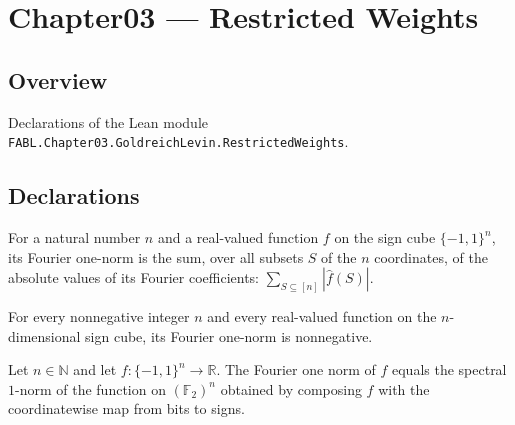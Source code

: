 \chapter{Chapter03 — Restricted Weights}
\section{Overview}

Declarations of the Lean module \texttt{FABL.Chapter03.GoldreichLevin.RestrictedWeights}.

\section{Declarations}

\begin{definition}
\label{FABL.fourierOneNorm}
\leanok
{}
For a natural number $n$ and a real-valued function $f$ on the sign cube $\{−1,1\}^n$,
its Fourier one-norm is the sum, over all subsets $S$ of the $n$ coordinates, of the
absolute values of its Fourier coefficients: $\sum_{S\subseteq[n]} |\widehat f(S)|$.
\end{definition}

\begin{theorem}
\label{FABL.fourierOneNorm_nonneg}
\leanok
{}
For every nonnegative integer $n$ and every real-valued function on the $n$-dimensional
sign cube, its Fourier one-norm is nonnegative.
\end{theorem}

\begin{theorem}
\label{FABL.fourierOneNorm_eq_spectralPNorm_one}
\leanok
{}
Let $n\in\mathbb N$ and let $f:\{-1,1\}^n\to\mathbb R$. The Fourier one norm of $f$
equals the spectral $1$-norm of the function on $(\mathbb F_2)^n$ obtained by composing
$f$ with the coordinatewise map from bits to signs.
\end{theorem}

